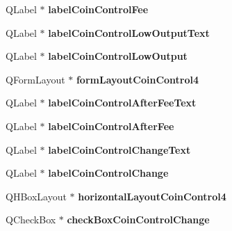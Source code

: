 \begin{DoxyCompactItemize}
Q\+Label $\ast$ {\bfseries label\+Coin\+Control\+Fee}
\item 
\mbox{\label{class_ui___send_coins_dialog_aeea421aaee3363933bd35f3b2dd34c87}} 
Q\+Label $\ast$ {\bfseries label\+Coin\+Control\+Low\+Output\+Text}
\item 
\mbox{\label{class_ui___send_coins_dialog_ac7292dcd70a93fbc518740c7ff54a132}} 
Q\+Label $\ast$ {\bfseries label\+Coin\+Control\+Low\+Output}
\item 
\mbox{\label{class_ui___send_coins_dialog_a26e79784958cf2df99c36a9c340852ae}} 
Q\+Form\+Layout $\ast$ {\bfseries form\+Layout\+Coin\+Control4}
\item 
\mbox{\label{class_ui___send_coins_dialog_a54f7e85264646ea79c1f077edd614343}} 
Q\+Label $\ast$ {\bfseries label\+Coin\+Control\+After\+Fee\+Text}
\item 
\mbox{\label{class_ui___send_coins_dialog_ae925cb984ff2102808134f0bd4ea70e9}} 
Q\+Label $\ast$ {\bfseries label\+Coin\+Control\+After\+Fee}
\item 
\mbox{\label{class_ui___send_coins_dialog_a1c520760f4991cf3e9019e32131731e2}} 
Q\+Label $\ast$ {\bfseries label\+Coin\+Control\+Change\+Text}
\item 
\mbox{\label{class_ui___send_coins_dialog_a4a172989e639f09d9c386c8329c1a987}} 
Q\+Label $\ast$ {\bfseries label\+Coin\+Control\+Change}
\item 
\mbox{\label{class_ui___send_coins_dialog_a589d0f2f7502ddd55c295c489398c072}} 
Q\+H\+Box\+Layout $\ast$ {\bfseries horizontal\+Layout\+Coin\+Control4}
\item 
\mbox{\label{class_ui___send_coins_dialog_a943b629d027fbc5b85789cfba293542a}} 
Q\+Check\+Box $\ast$ {\bfseries check\+Box\+Coin\+Control\+Change}
\item 
\mbox{\label{class_ui___send_coins_dialog_a452cbcad1440251ecc52421d63f60270}} 

\end{DoxyCompactItemize}
